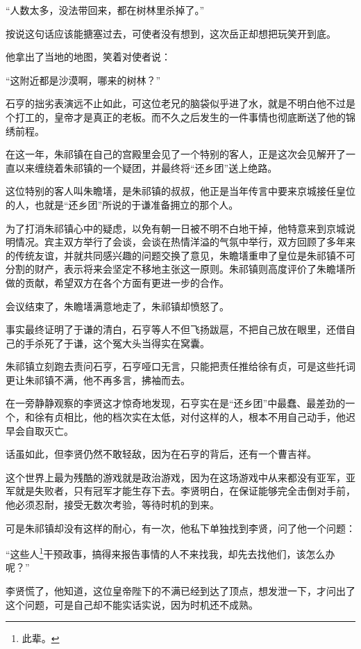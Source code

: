 \begin{multicols}{\theparacolNo}
		“人数太多，没法带回来，都在树林里杀掉了。”

		按说这句话应该能搪塞过去，可使者没有想到，这次岳正却想把玩笑开到底。

		他拿出了当地的地图，笑着对使者说：

		“这附近都是沙漠啊，哪来的树林？”

		石亨的拙劣表演远不止如此，可这位老兄的脑袋似乎进了水，就是不明白他不过是个打工的，皇帝才是真正的老板。而不久之后发生的一件事情也彻底断送了他的锦绣前程。

		在这一年，朱祁镇在自己的宫殿里会见了一个特别的客人，正是这次会见解开了一直以来缠绕着朱祁镇的一个疑团，并最终将“还乡团”送上绝路。

		这位特别的客人叫朱瞻墡，是朱祁镇的叔叔，他正是当年传言中要来京城接任皇位的人，也就是“还乡团”所说的于谦准备拥立的那个人。

		为了打消朱祁镇心中的疑虑，以免有朝一日被不明不白地干掉，他特意来到京城说明情况。宾主双方举行了会谈，会谈在热情洋溢的气氛中举行，双方回顾了多年来的传统友谊，并就共同感兴趣的问题交换了意见，朱瞻墡重申了皇位是朱祁镇不可分割的财产，表示将来会坚定不移地主张这一原则。朱祁镇则高度评价了朱瞻墡所做的贡献，希望双方在各个方面有更进一步的合作。

		会议结束了，朱瞻墡满意地走了，朱祁镇却愤怒了。

		事实最终证明了于谦的清白，石亨等人不但飞扬跋扈，不把自己放在眼里，还借自己的手杀死了于谦，这个冤大头当得实在窝囊。

		朱祁镇立刻跑去责问石亨，石亨哑口无言，只能把责任推给徐有贞，可是这些托词更让朱祁镇不满，他不再多言，拂袖而去。

		在一旁静静观察的李贤这才惊奇地发现，石亨实在是“还乡团”中最蠢、最差劲的一个，和徐有贞相比，他的档次实在太低，对付这样的人，根本不用自己动手，他迟早会自取灭亡。

		话虽如此，但李贤仍然不敢轻敌，因为在石亨的背后，还有一个曹吉祥。

		这个世界上最为残酷的游戏就是政治游戏，因为在这场游戏中从来都没有亚军，亚军就是失败者，只有冠军才能生存下去。李贤明白，在保证能够完全击倒对手前，他必须忍耐，接受无数次考验，等待时机的到来。

		可是朱祁镇却没有这样的耐心，有一次，他私下单独找到李贤，问了他一个问题：

		“这些人\footnote{此辈。}干预政事，搞得来报告事情的人不来找我，却先去找他们，该怎么办呢？”

		李贤慌了，他知道，这位皇帝陛下的不满已经到达了顶点，想发泄一下，才问出了这个问题，可是自己却不能实话实说，因为时机还不成熟。


\end{multicols}
